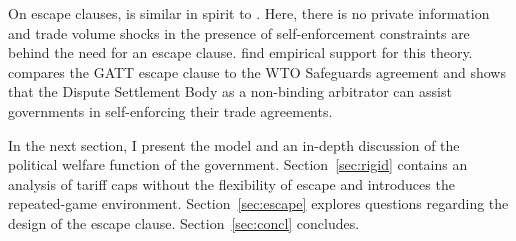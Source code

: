 On escape clauses, \Textcite{bs1990} is similar in spirit to \Textcite{bs2005}. Here, there is no private information and trade volume shocks in the presence of self-enforcement constraints are behind the need for an escape clause. \Textcite{bc} find empirical support for this theory. \Textcite{beshkar2010b} compares the GATT escape clause to the WTO Safeguards agreement and shows that the Dispute Settlement Body as a non-binding arbitrator can assist governments in self-enforcing their trade agreements.

In the next section, I present the model and an in-depth discussion of the political welfare function of the government. Section~\ref{sec:rigid} contains an analysis of tariff caps without the flexibility of escape and introduces the repeated-game environment. Section~\ref{sec:escape} explores questions regarding the design of the escape clause. Section~\ref{sec:concl} concludes.